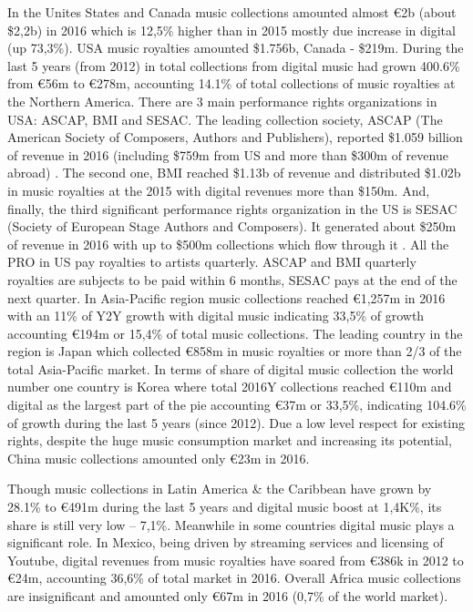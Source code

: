 \documentclass[12pt]{report}
\begin{document}
\begin{multicols}{2}
In the Unites States and Canada music collections amounted almost \euro 2b (about \$2,2b) in 2016 which is 12,5\% higher than in 2015 mostly due increase in digital (up 73,3\%). USA music royalties amounted \$1.756b, Canada - \$219m. During the last 5 years (from 2012) in total collections from digital music had grown 400.6\% from \euro 56m to \euro 278m, accounting 14.1\% of total collections of music royalties at the Northern America. There are 3 main performance rights organizations in USA: ASCAP, BMI and SESAC. The leading collection society, ASCAP (The American Society of Composers, Authors and Publishers), reported \$1.059 billion of revenue  in 2016 (including \$759m from US and more than \$300m of revenue abroad) . The second one, BMI reached \$1.13b of revenue and distributed \$1.02b in music royalties at the 2015  with digital revenues more than \$150m.  And, finally, the third significant performance rights organization in the US is SESAC (Society of European Stage Authors and Composers). It generated about \$250m of revenue in 2016 with up to \$500m collections which flow through it . All the PRO in US pay royalties to artists quarterly. ASCAP and BMI quarterly royalties are subjects to be paid within 6 months,  SESAC pays at the end of the next quarter.
In Asia-Pacific region music collections reached \euro 1,257m in 2016 with an 11\% of Y2Y growth with digital music indicating 33,5\% of growth accounting \euro 194m or 15,4\% of total music collections. The leading country in the region is Japan which collected \euro 858m in music royalties or more than 2/3  of the total Asia-Pacific market. In terms of share of digital music collection the world number one country is Korea where total 2016Y collections reached \euro 110m and digital as the largest part of the pie accounting \euro 37m or 33,5\%, indicating 104.6\% of growth during the last 5 years (since 2012). Due a low level respect for existing rights, despite the huge music consumption market and increasing its potential, China music collections amounted only \euro 23m in 2016.
 
Though music collections in Latin America \& the Caribbean have grown by 28.1\% to \euro 491m during the last 5 years and digital music boost at 1,4K\%, its share is still very low – 7,1\%.   Meanwhile in some countries digital music plays a significant role. In Mexico, being driven by streaming services and licensing of Youtube, digital revenues from music royalties have soared from \euro 386k in 2012 to \euro 24m, accounting 36,6\% of total market in 2016. Overall Africa music collections are insignificant and amounted only \euro 67m in 2016 (0,7\% of the world market).
 

\end{multicols}
\end{document}
